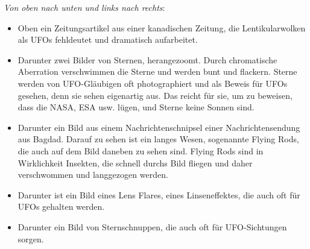 \documentclass{scrartcl}
\begin{document}
\textit{Von oben nach unten und links nach rechts}:

\begin{itemize}
	\item Oben ein Zeitungsartikel aus einer kanadischen Zeitung, die Lentikularwolken als UFOs fehldeutet und dramatisch aufarbeitet.
	\item Darunter zwei Bilder von Sternen, herangezoomt. Durch chromatische Aberration verschwimmen die Sterne und werden bunt und flackern. Sterne werden von UFO-Gläubigen oft photographiert und als Beweis für UFOs gesehen, denn sie sehen eigenartig aus. Das reicht für sie, um zu beweisen, dass die NASA, ESA usw. lügen, und Sterne keine Sonnen sind.
	\item Darunter ein Bild aus einem Nachrichtenschnipsel einer Nachrichtensendung aus Bagdad. Darauf zu sehen ist ein langes Wesen, sogenannte Flying Rods, die auch auf dem Bild daneben zu sehen sind. Flying Rods sind in Wirklichkeit Insekten, die schnell durchs Bild fliegen und daher verschwommen und langgezogen werden.
	\item Darunter ist ein Bild eines Lens Flares, eines Linseneffektes, die auch oft für UFOs gehalten werden.
	\item Darunter ein Bild von Sternschnuppen, die auch oft für UFO-Sichtungen sorgen.
\end{itemize}
\end{document}
